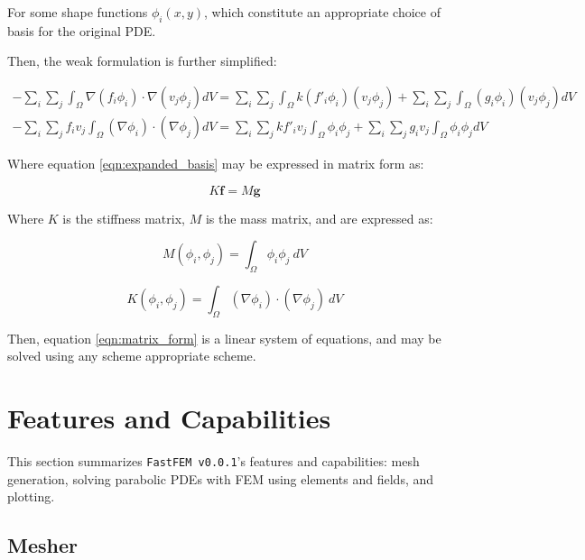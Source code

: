 \documentclass[headings=standardclasses, abstract=true]{scrartcl}
\begin{document}
For some shape functions $\phi_i(x,y)$, which constitute an appropriate choice of basis for the original PDE.

Then, the weak formulation is further simplified:

\begin{align}
    - \sum_i \sum_j \int_\Omega \nabla(f_i \phi_i) \cdot \nabla(v_j \phi_j) dV = \sum_i \sum_j \int_\Omega k (f'_i \phi_i) (v_j \phi_j) + \sum_i \sum_j \int_\Omega (g_i \phi_i) (v_j \phi_j) dV \\
    - \sum_i \sum_j f_i v_j \int_\Omega (\nabla \phi_i) \cdot (\nabla \phi_j) dV = \sum_i \sum_j k f'_i v_j \int_\Omega  \phi_i \phi_j+ \sum_i \sum_j g_i v_j \int_\Omega \phi_i \phi_j dV \label{eqn:expanded_basis}
\end{align}

Where equation \ref{eqn:expanded_basis} may be expressed in matrix form as:

\begin{equation}
K \mathbf{f} = M \mathbf{g} \label{eqn:matrix_form}
\end{equation}

Where $K$ is the stiffness matrix, $M$ is the mass matrix, and are expressed as:

\begin{equation}
    M(\phi_i,\phi_j) = \int_{\Omega}\phi_i \phi_j~dV
    \label{eqn:mass_matrix}
\end{equation}

\begin{equation}
    K(\phi_i,\phi_j) = \int_{\Omega}(\nabla\phi_i)\cdot (\nabla\phi_j)~dV
    \label{eqn:stiffness_matrix}
\end{equation}

Then, equation \ref{eqn:matrix_form} is a linear system of equations, and may be solved using any scheme appropriate scheme.

\section{Features and Capabilities}

This section summarizes \texttt{FastFEM v0.0.1}'s features and capabilities: mesh generation, solving parabolic PDEs with FEM using elements and fields, and plotting.

\subsection{Mesher}
\end{document}

